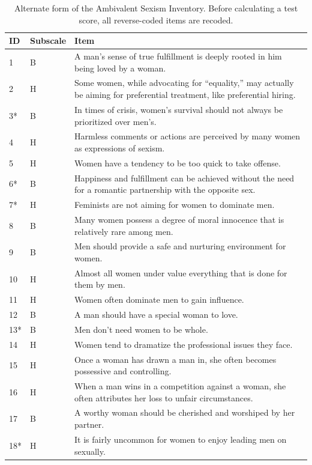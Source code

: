 \documentclass{DESSThesis}
\begin{document}
\begin{table}
	\centering
	\caption{Alternate form of the Ambivalent Sexism Inventory. Before calculating a test score, all reverse-coded items are recoded.}
	\label{tab:ASI-af}
	\begin{threeparttable}
		\renewcommand*{\arraystretch}{1.3}
		\setlength{\tabcolsep}{0.3em}
		\begin{tabularx}{\textwidth}{llX}
			\toprule
			ID &  Subscale  & Item \\
			\midrule
			1&B&A man's sense of true fulfillment is deeply rooted in him being loved by a woman.\\
			2&H&Some women, while advocating for ``equality,'' may actually be aiming for preferential treatment, like preferential hiring.\\
			3*&B&In times of crisis, women's survival should not always be prioritized over men's.\\
			4&H&Harmless comments or actions are perceived by many women as expressions of sexism.\\
			5&H&Women have a tendency to be too quick to take offense.\\
			6*&B&Happiness and fulfillment can be achieved without the need for a romantic partnership with the opposite sex.\\
			7*&H&Feminists are not aiming for women to dominate men.\\
			8&B&Many women possess a degree of moral innocence that is relatively rare among men.\\
			9&B&Men should provide a safe and nurturing environment for women.\\
			10&H&Almost all women under value everything that is done for them by men.\\
			11&H&Women often dominate men to gain influence.\\
			12&B&A man should  have a special woman to love.\\
			13*&B&Men don't need women to be whole.\\
			14&H&Women tend to dramatize the professional issues they face.\\
			15&H&Once a woman has drawn a man in, she often becomes possessive and controlling.\\
			16&H&When a man wins in a competition against a woman, she often attributes her loss to unfair circumstances.\\
			17&B&A worthy woman should be cherished and worshiped by her partner.\\
			18*&H&It is fairly uncommon for women to enjoy leading men on sexually.\\

\end{tabularx}
\end{threeparttable}
\end{table}
\end{document}
